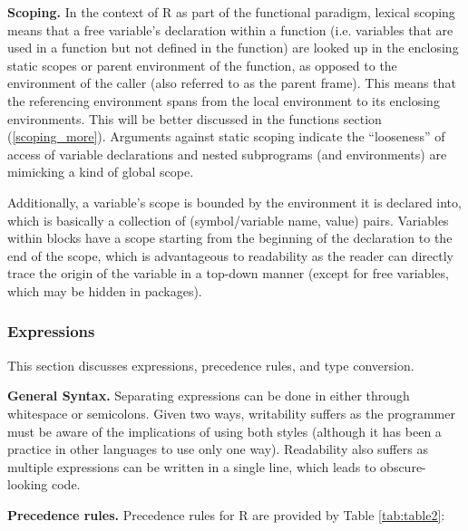 \documentclass[12pt]{article}
\begin{document}
\textbf{Scoping.} In the context of R as part of the functional paradigm, lexical scoping means that a free variable's declaration within a function (i.e. variables that are used in a function but not defined in the function) are looked up in the enclosing static scopes or parent environment of the function, as opposed to the environment of the caller (also referred to as the parent frame). This means that the referencing environment spans from the local environment to its enclosing environments. This will be better discussed in the functions section (\ref{scoping_more}). Arguments against static scoping indicate the ``looseness'' of access of variable declarations and nested subprograms (and environments) are mimicking a kind of global scope.

Additionally, a variable's scope is bounded by the environment it is declared into, which is basically a collection of (symbol/variable name, value) pairs. Variables within blocks have a scope starting from the beginning of the declaration to the end of the scope, which is advantageous to readability as the reader can directly trace the origin of the variable in a top-down manner (except for free variables, which may be hidden in packages).

\subsubsection{Expressions}

This section discusses expressions, precedence rules, and type conversion.

\textbf{General Syntax.} Separating expressions can be done in either through whitespace or semicolons. Given two ways, writability suffers as the programmer must be aware of the implications of using both styles (although it has been a practice in other languages to use only one way). Readability also suffers as multiple expressions can be written in a single line, which leads to obscure-looking code.

\textbf{Precedence rules.} Precedence rules for R are provided by Table \ref{tab:table2}:
\end{document}
